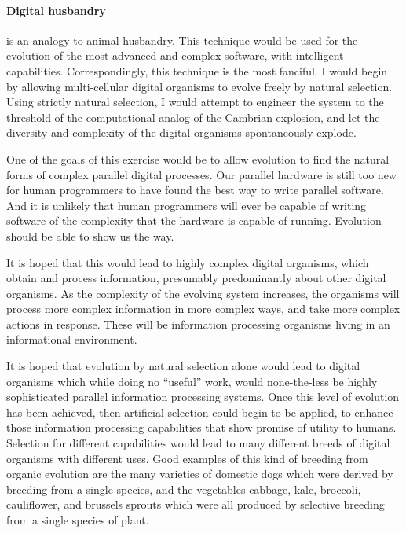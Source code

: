 \paragraph{Digital husbandry} is an analogy to animal husbandry.  This
technique would be used for the evolution of the most advanced and
complex software, with intelligent capabilities.  Correspondingly,
this technique is the most fanciful.  I would begin by allowing
multi-cellular digital organisms to evolve freely by natural selection.
Using strictly natural selection, I would attempt to engineer the
system to the threshold of the computational analog of the Cambrian
explosion, and let the diversity and complexity of the digital organisms
spontaneously explode.

One of the goals of this exercise would be to allow evolution to find
the natural forms of complex parallel digital processes.  Our parallel
hardware is still too new for human programmers to have found the
best way to write parallel software.  And it is unlikely that human
programmers will ever be capable of writing software of the
complexity that the hardware is capable of running.  Evolution
should be able to show us the way.

It is hoped that this would lead to highly complex digital organisms,
which obtain and process information, presumably predominantly about
other digital organisms.  As the complexity of the evolving system
increases, the organisms will process more complex information in
more complex ways, and take more complex actions in response.  These
will be information processing organisms living in an informational
environment.

It is hoped that evolution by natural selection alone would lead to
digital organisms which while doing no ``useful'' work, would
none-the-less be highly sophisticated parallel information processing
systems.  Once this level of evolution has been achieved, then artificial
selection could begin to be applied, to enhance those information
processing capabilities that show promise of utility to humans.
Selection for different capabilities would lead to many different
breeds of digital organisms with different uses.  Good examples of
this kind of breeding from organic evolution are the many varieties
of domestic dogs which were derived by breeding from a single species,
and the vegetables cabbage, kale, broccoli, cauliflower, and brussels
sprouts which were all produced by selective breeding from a single
species of plant.

